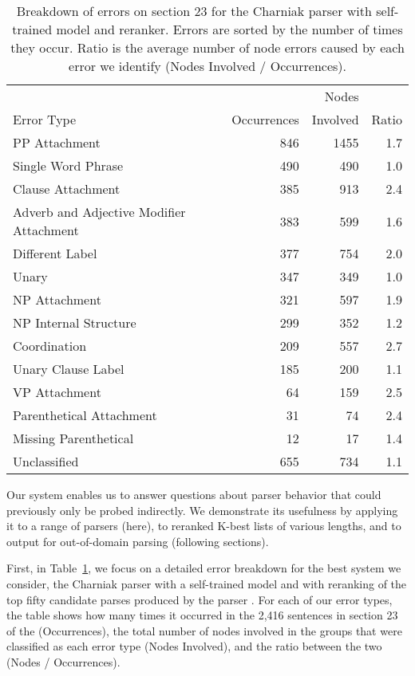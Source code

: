 \begin{table}
\begin{center}
\begin{tabular}{|lrrr|}
	\hline
		           &             & Nodes    &       \\
		Error Type & Occurrences & Involved & Ratio \\
	\hline
	\hline
		PP Attachment & 846 & 1455 & 1.7 \\
		Single Word Phrase & 490 & 490 & 1.0 \\
		Clause Attachment & 385 & 913 & 2.4 \\
		Adverb and Adjective Modifier Attachment & 383 & 599 & 1.6 \\
		Different Label & 377 & 754 & 2.0 \\
		Unary & 347 & 349 & 1.0 \\
		NP Attachment & 321 & 597 & 1.9 \\
		NP Internal Structure & 299 & 352 & 1.2 \\
		Coordination & 209 & 557 & 2.7 \\
		Unary Clause Label & 185 & 200 & 1.1 \\
		VP Attachment & 64 & 159 & 2.5 \\
		Parenthetical Attachment & 31 & 74 & 2.4 \\
		Missing Parenthetical & 12 & 17 & 1.4 \\
		Unclassified & 655 & 734 & 1.1 \\
	\hline
\end{tabular}
\caption[Breakdown of errors on section 23 for the Charniak parser with self-trained model and reranker.]{ \label{tab:charniak-breakdown}
	Breakdown of errors on section 23 for the Charniak parser with self-trained model and reranker.
	Errors are sorted by the number of times they occur.
	Ratio is the average number of node errors caused by each error we identify
	(\myie Nodes Involved / Occurrences).
}
\end{center}
\end{table}

Our system enables us to answer questions about parser behavior that could previously only be probed indirectly.
We demonstrate its usefulness by applying it to a range of parsers (here), to reranked K-best lists of various lengths, and to output for out-of-domain parsing (following sections).

First, in Table~\ref{tab:charniak-breakdown}, we focus on a detailed error breakdown for the best system we consider, the Charniak parser with a self-trained model and with reranking of the top fifty candidate parses produced by the parser \parencite{Charniak:2000,Charniak-Johnson:2005,McClosky-Charniak-Johnson:2006}.
For each of our error types, the table shows how many times it occurred in the 2,416 sentences in \wsj section 23 of the \ptb (Occurrences), the total number of nodes involved in the groups that were classified as each error type (Nodes Involved), and the ratio between the two (Nodes / Occurrences).

